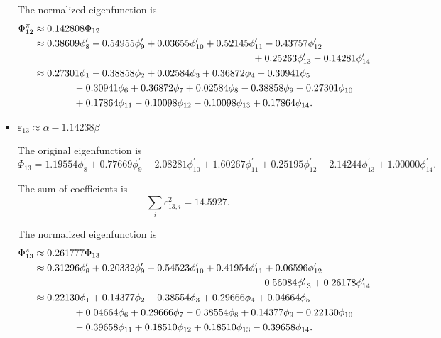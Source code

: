 \begin{itemize}
		The normalized eigenfunction is		
		\begin{align}
			\Phi^\pi_{12} &\approx 0.142808 \Phi_{12} \notag \\
			&\approx 0.38609 \phi^\prime_8 - 0.54955 \phi^\prime_9 + 0.03655 \phi^\prime_{10} + 0.52145 \phi^\prime_{11} - 0.43757  \phi^\prime_{12}  \notag\\
			&\hspace*{22em} +0.25263 \phi^\prime_{13} - 0.14281  \phi^\prime_{14} \notag \\
			&\approx 0.27301 \phi_1 -0.38858  \phi_2  +0.02584 \phi_3 +0.36872 \phi_4 -0.30941  \phi_5  \notag \\
			&\hspace*{4em} -0.30941 \phi_6  +0.36872 \phi_7 +0.02584 \phi_8  -0.38858 \phi_9 +0.27301 \phi_{10} \notag \\
			&\hspace*{4em} +0.17864 \phi_{11} -0.10098  \phi_{12}   -0.10098 \phi_{13}  +0.17864 \phi_{14} .
		\end{align}
		
		
		\item $\varepsilon_{13} \approx \alpha - 1.14238 \beta$
		
		The original eigenfunction is
		\begin{equation*}
			\Phi_{13} =  1.19554 \phi^\prime_8 + 0.77669 \phi^\prime_9 -2.08281  \phi^\prime_{10} + 1.60267 \phi^\prime_{11}   +0.25195 \phi^\prime_{12} -2.14244 \phi^\prime_{13} + 1.00000 \phi^\prime_{14}.
		\end{equation*}
		
		The sum of coefficients is
		\begin{equation*}
			\sum_{i} c^2_{13,i} = 14.5927.
		\end{equation*}
		
		The normalized eigenfunction is		
		\begin{align}
			\Phi^\pi_{13} &\approx  0.261777 \Phi_{13} \notag \\
			&\approx  0.31296 \phi^\prime_8 + 0.20332 \phi^\prime_9  -0.54523 \phi^\prime_{10} +0.41954 \phi^\prime_{11} + 0.06596  \phi^\prime_{12}  \notag\\
			&\hspace*{22em} -0.56084 \phi^\prime_{13} + 0.26178  \phi^\prime_{14} \notag \\
			&\approx  0.22130 \phi_1 +0.14377 \phi_2 -0.38554  \phi_3 +0.29666 \phi_4 + 0.04664  \phi_5  \notag \\
			&\hspace*{4em} + 0.04664  \phi_6  +0.29666 \phi_7 -0.38554  \phi_8  +0.14377 \phi_9 + 0.22130 \phi_{10} \notag \\
			&\hspace*{4em}  -0.39658 \phi_{11} +0.18510 \phi_{12}  +0.18510 \phi_{13} -0.39658 \phi_{14} .
		\end{align}
		

\end{itemize}
